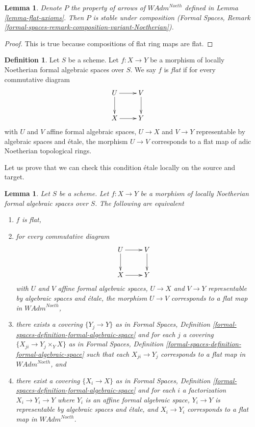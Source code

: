 \documentclass{stacks-project}
\theoremstyle{plain}
\newtheorem{lemma}[subsection]{Lemma}
\theoremstyle{definition}
\newtheorem{definition}[subsection]{Definition}
\theoremstyle{remark}
\numberwithin{equation}{subsection}
\begin{document}
\begin{lemma}
\label{lemma-composition-flat-continuous}
Denote $P$ the property of arrows of $\textit{WAdm}^{Noeth}$
defined in Lemma \ref{lemma-flat-axioms}.
Then $P$ is stable under composition (Formal Spaces, Remark
\ref{formal-spaces-remark-composition-variant-Noetherian}).
\end{lemma}

\begin{proof}
This is true because compositions of flat ring maps are flat.
\end{proof}

\begin{definition}
\label{definition-flat}
Let $S$ be a scheme. Let $f : X \to Y$ be a morphism of locally
Noetherian formal algebraic spaces over $S$. We say $f$ is
{\it flat} if for every commutative diagram
$$
\xymatrix{
U \ar[d] \ar[r] & V \ar[d] \\
X \ar[r] & Y
}
$$
with $U$ and $V$ affine formal algebraic spaces, $U \to X$ and $V \to Y$
representable by algebraic spaces and \'etale, the morphism $U \to V$
corresponds to a flat map of adic Noetherian topological rings.
\end{definition}

\noindent
Let us prove that we can check this condition \'etale locally on the
source and target.

\begin{lemma}
\label{lemma-flat-morphisms}
Let $S$ be a scheme. Let $f : X \to Y$ be a morphism of
locally Noetherian formal algebraic spaces over $S$.
The following are equivalent
\begin{enumerate}
\item $f$ is flat,
\item for every commutative diagram
$$
\xymatrix{
U \ar[d] \ar[r] & V \ar[d] \\
X \ar[r] & Y
}
$$
with $U$ and $V$ affine formal algebraic spaces, $U \to X$ and $V \to Y$
representable by algebraic spaces and \'etale, the morphism $U \to V$
corresponds to a flat map in $\textit{WAdm}^{Noeth}$,
\item there exists a covering $\{Y_j \to Y\}$ as in
Formal Spaces,
Definition \ref{formal-spaces-definition-formal-algebraic-space}
and for each $j$
a covering $\{X_{ji} \to Y_j \times_Y X\}$ as in
Formal Spaces,
Definition \ref{formal-spaces-definition-formal-algebraic-space}
such that each $X_{ji} \to Y_j$  corresponds
to a flat map in $\textit{WAdm}^{Noeth}$, and
\item there exist a covering $\{X_i \to X\}$ as in
Formal Spaces,
Definition \ref{formal-spaces-definition-formal-algebraic-space}
and for each $i$ a factorization $X_i \to Y_i \to Y$ where $Y_i$
is an affine formal algebraic space, $Y_i \to Y$ is representable
by algebraic spaces and \'etale, and $X_i \to Y_i$ corresponds
to a flat map in $\textit{WAdm}^{Noeth}$.
\end{enumerate}
\end{lemma}
\end{document}

